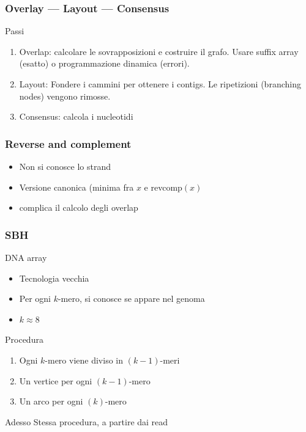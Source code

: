 \begin{frame}[fragile]
\frametitle{Overlay --- Layout --- Consensus}
\begin{block}{Passi}
\begin{enumerate}
\item
Overlap: calcolare le sovrapposizioni e costruire il grafo.
Usare suffix array (esatto) o programmazione dinamica (errori).
\item
Layout: Fondere i cammini per ottenere i  \alert{contigs}.
Le ripetizioni (branching nodes) vengono rimosse.
\item
Consensus: calcola i nucleotidi
\end{enumerate}
\end{block}
\end{frame}

\begin{frame}[fragile]
\frametitle{Reverse and complement}
\begin{itemize}
\item
Non si conosce lo strand
\item
Versione canonica (minima fra $x$ e revcomp$(x)$
\item
complica il calcolo degli overlap
\end{itemize}
\end{frame}

\begin{frame}[fragile]
\frametitle{SBH}
\begin{block}{DNA array}
\begin{itemize}
\item
Tecnologia vecchia
\item
Per ogni $k$-mero, si conosce se appare nel genoma
\item
$k\approx 8$
\end{itemize}
\end{block}

\begin{block}{Procedura}
\begin{enumerate}
\item
Ogni $k$-mero viene diviso in $(k-1)$-meri
\item
Un vertice per ogni $(k-1)$-mero
\item
Un arco per ogni $(k)$-mero
\end{enumerate}
\end{block}
\begin{block}{Adesso}
Stessa procedura, a partire dai read
\end{block}

\end{frame}



